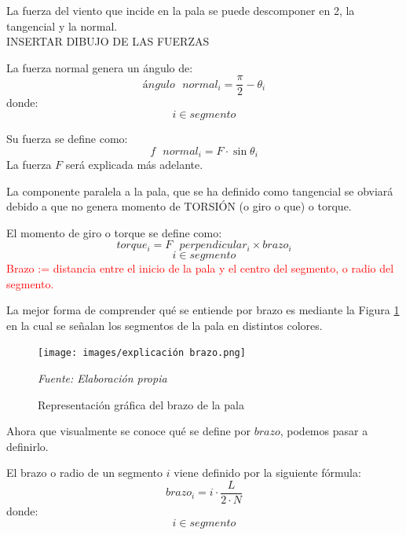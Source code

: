 La fuerza del viento que incide en la pala se puede descomponer en 2, la tangencial y la normal. \\

 INSERTAR DIBUJO DE LAS FUERZAS \\
 
 \begin{definicion}
 La fuerza normal genera un ángulo de:
 $$ ángulo \text{ } normal_i = \dfrac{\pi}{2} - \theta_i $$
 donde:
 $$ i \in segmento$$
 \end{definicion}

 \begin{definicion}
  Su fuerza se define como:
  $$ f \text{ } normal_i = F \cdot \sin{\theta_i}$$
   La fuerza $F$ será explicada más adelante.
  \label{def:fuerza_normal}
 \end{definicion}

 
 La componente paralela a la pala, que se ha definido como tangencial se obviará debido a que no genera momento de TORSIÓN (o giro o que) o torque. 
 
 \begin{definicion}
El momento de giro o torque se define como:
 $$ torque_i = F \text{ } perpendicular_i \times brazo_i$$
 $$ i \in segmento$$
 \label{def:torque} %
 \textcolor{red}{Brazo := distancia entre el inicio de la pala y el centro del segmento, o radio del segmento.} \\
 \end{definicion}

 La mejor forma de comprender qué se entiende por brazo es mediante la Figura \ref{fig:exp_brazo} en la cual se señalan los segmentos de la pala en distintos colores.
 
     \textbf{}
    \begin{figure}[H]
    \centering
    \texttt{[image: images/explicación brazo.png]}
    \caption{Representación gráfica del brazo de la pala}
    \label{fig:exp_brazo}
    \textit{Fuente: Elaboración propia}
\end{figure}

Ahora que visualmente se conoce qué se define por $brazo$, podemos pasar a definirlo.

\begin{definicion}
El  brazo o radio de un segmento $i$ viene definido por la siguiente fórmula:
$$ brazo_i  =  i \cdot \dfrac{L}{2 \cdot N}$$
    donde:
 $$ i \in segmento$$

\end{definicion}

